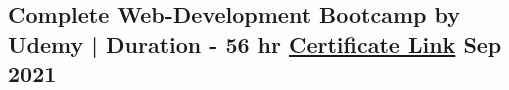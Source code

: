 \documentclass[a4,11pt]{article}
\begin{document}
\subsection*{Complete Web-Development Bootcamp \normalfont by Udemy | Duration - 56 hr   
\href{https://www.hackerrank.com/akhilsharmaa}{Certificate Link} 
\hfill  Sep 2021}
\vspace{0.2cm}




\end{document}
